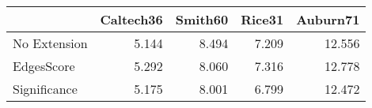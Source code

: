 \begin{tabular}{lrrrr}
\toprule
{} & Caltech36 & Smith60 & Rice31 & Auburn71 \\
\midrule
No Extension &     5.144 &   8.494 &  7.209 &   12.556 \\
EdgesScore   &     5.292 &   8.060 &  7.316 &   12.778 \\
Significance &     5.175 &   8.001 &  6.799 &   12.472 \\
\bottomrule
\end{tabular}
